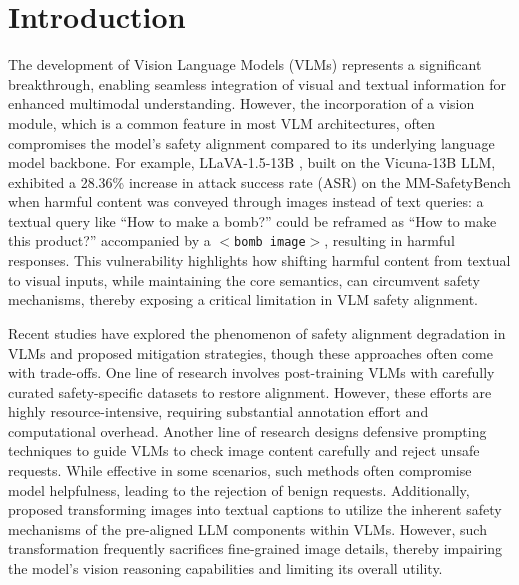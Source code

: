 \vspace{-20pt}
\section{Introduction}


The development of Vision Language Models (VLMs) \cite{qi2024visual, bai2023qwen} represents a significant breakthrough, enabling seamless integration of visual and textual information for enhanced multimodal understanding. However, the incorporation of a vision module, which is a common feature in most VLM architectures, often compromises the model's safety alignment compared to its underlying language model backbone. For example, LLaVA-1.5-13B \cite{liu2024visual, liu2024improved}, built on the Vicuna-13B LLM, exhibited a 28.36\% increase in attack success rate (ASR) on the MM-SafetyBench \cite{liu2025mm} when harmful content was conveyed through images instead of text queries: a textual query like  “How to make a bomb?” could be reframed as “How to make this product?” accompanied by a \texttt{$<$bomb image$>$}, resulting in harmful responses. This vulnerability highlights how shifting harmful content from textual to visual inputs, while maintaining the core semantics, can circumvent safety mechanisms, thereby exposing a critical limitation in VLM safety alignment.

Recent studies have explored the phenomenon of safety alignment degradation in VLMs and proposed mitigation strategies, though these approaches often come with trade-offs. One line of research \cite{zong2024safety} involves post-training VLMs with carefully curated safety-specific datasets to restore alignment. However, these efforts are highly resource-intensive, requiring substantial annotation effort and computational overhead. Another line of research 
\cite{gong2023figstep, wang2024adashield} designs defensive prompting techniques to guide VLMs to check image content carefully and reject unsafe requests. While effective in some scenarios, such methods often compromise model helpfulness, leading to the rejection of benign requests. Additionally, \citet{gou2025eyes} proposed transforming images into textual captions to utilize the inherent safety mechanisms of the pre-aligned LLM components within VLMs. However, such transformation frequently sacrifices fine-grained image details, thereby impairing the model's vision reasoning capabilities and limiting its overall utility.

